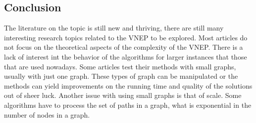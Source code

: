 \subsection{Conclusion}
The literature on the topic is still new and thriving, there are still many interesting research topics related to the VNEP to be explored. Most articles do not focus on the theoretical aspects of the complexity of the VNEP\@. There is a lack of interest int the behavior of the algorithms for larger instances that those that are used nowadays. Some articles test their methods with small graphs, usually with just one graph. These types of graph can be manipulated or the methods can yield improvements on the running time and quality of the solutions out of sheer luck. Another issue with using small graphs is that of scale. Some algorithms have to process the set of paths in a graph, what is exponential in the number of nodes in a graph.
